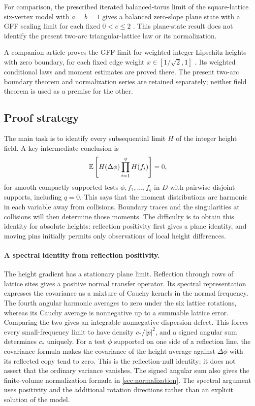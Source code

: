 For comparison, the prescribed iterated balanced-torus limit of the
square-lattice six-vertex model with $a=b=1$ gives a balanced zero-slope
plane state with a GFF scaling limit for each fixed $0<c\le2$
\cite[Theorem~1.1]{OpenAIBalancedSixVertex2026}.
This plane-state result does not identify the present two-arc
triangular-lattice law or its normalization.

A companion article proves the GFF limit for weighted integer Lipschitz
heights with zero boundary, for each fixed edge weight
$x\in[1/\sqrt2,1]$ \cite[Theorem~1.2]{OpenAIWeighted2026}.
Its weighted conditional laws and moment estimates are proved there.
The present two-arc boundary theorem and normalization series are retained
separately; neither field theorem is used as a premise for the other.

\subsection{Proof strategy}

The main task is to identify every subsequential limit $H$ of the integer
height field.  A key intermediate conclusion is
\begin{equation}\label{eq:strategy-harmonicity}
 \mathbb E\left[H(\Delta\phi)\prod_{i=1}^qH(f_i)\right]=0,
\end{equation}
for smooth compactly supported tests $\phi,f_1,\ldots,f_q$ in $D$ with
pairwise disjoint supports, including $q=0$.  This says that the moment
distributions are harmonic in each variable away from collisions.  Boundary
traces and the singularities at collisions will then determine those moments.
The difficulty is to obtain this identity for absolute heights: reflection
positivity first gives a plane identity, and moving pins initially permits
only observations of local height differences.

\paragraph{A spectral identity from reflection positivity.}
The height gradient has a stationary plane limit.  Reflection through rows
of lattice sites gives a positive normal transfer operator.  Its spectral
representation expresses the covariance as a mixture of Cauchy kernels
in the normal frequency.  The fourth angular harmonic averages to zero
under the six lattice rotations, whereas its Cauchy average is nonnegative
up to a summable lattice error.  Comparing the two gives an integrable
nonnegative dispersion defect.  This forces every small-frequency limit to have density
$c_*/|p|^2$, and a signed angular sum determines $c_*$ uniquely.
For a test $\phi$ supported on one side of a reflection line, the covariance
formula makes the covariance of the height average against $\Delta\phi$
with its reflected copy tend to zero.  This is the reflection-null identity;
it does not assert that the ordinary variance vanishes.  The signed angular
sum also gives the finite-volume normalization formula in
\cref{sec:normalization}.  The spectral argument uses positivity and the
additional rotation directions rather than an explicit solution of the model.

